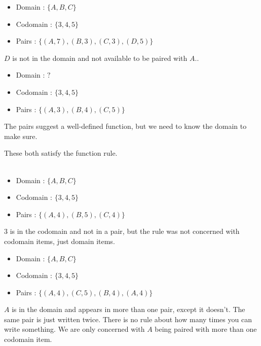 \documentclass{ximera}
\begin{document}
\begin{question}
\begin{itemize}
\item Domain : $\{ A, B, C \}$
\item Codomain : $\{ 3, 4, 5 \}$
\item Pairs : $\{ (A, 7), (B, 3), (C, 3), (D, 5) \}$
\end{itemize}

\begin{multipleChoice}
\end{multipleChoice}
\begin{feedback}
$D$ is not in the domain and not available to be paired with $A$..
\end{feedback}
\end{question}


\begin{question}
\begin{itemize}
\item Domain : $?$
\item Codomain : $\{ 3, 4, 5 \}$
\item Pairs : $\{ (A, 3), (B, 4), (C, 5) \}$
\end{itemize}

\begin{multipleChoice}
\end{multipleChoice}
\begin{feedback}
The pairs suggest a well-defined function, but we need to know the domain to make sure.
\end{feedback}
\end{question}



\begin{example}
These both satisfy the function rule. \\
\quad \\
\begin{itemize}
\item Domain : $\{ A, B, C \}$
\item Codomain : $\{ 3, 4, 5 \}$
\item Pairs : $\{ (A, 4), (B, 5), (C, 4) \}$
\end{itemize}
$3$ is in the codomain and not in a pair, but the rule was not concerned with codomain items, just domain items.

\begin{itemize}
\item Domain : $\{ A, B, C \}$
\item Codomain : $\{ 3, 4, 5 \}$
\item Pairs : $\{ (A, 4), (C, 5) , (B, 4), (A, 4) \}$
\end{itemize}
$A $ is in the domain and appears in more than one pair, except it doesn't. The same pair is just written twice.  There is no rule about how many times you can write something.  We are only concerned with $A$ being paired with more than one codomain item.
\end{example}
\quad \\
\end{document}
